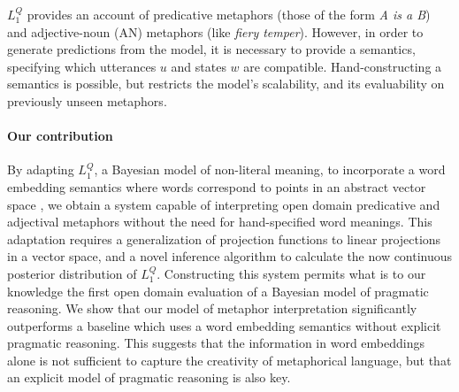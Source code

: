 \documentclass[9pt,twocolumn,twoside,lineno]{pnas-new}
\newcommand{\Listener}{L}
\newcommand{\QLONE}{\Listener_{{1}}^{{Q}}}
\begin{document}
	


	
% 

	$\QLONE$ provides an account of predicative metaphors (those of the form \emph{A is a B}) and adjective-noun (AN) metaphors (like \emph{fiery temper}). However, in order to generate predictions from the model, it is necessary to provide a semantics, specifying which utterances $u$ and states $w$ are compatible. Hand-constructing a semantics is possible, but restricts the model's scalability, and its evaluability on previously unseen metaphors.

	\paragraph{Our contribution} 


	By adapting $\QLONE$, a Bayesian model of non-literal meaning, to incorporate a word embedding semantics where words correspond to points in an abstract vector space \cite{mikolov2013distributed,pennington2014glove}, we obtain a system capable of interpreting open domain predicative and adjectival metaphors without the need for hand-specified word meanings. 
	This adaptation requires a generalization of projection functions to linear projections in a vector space, and a novel inference algorithm to calculate the now continuous posterior distribution of $\QLONE$.
	Constructing this system permits what is to our knowledge the first open domain evaluation of a Bayesian model of pragmatic reasoning.
	We show that our model of metaphor interpretation significantly outperforms a baseline which uses a word embedding semantics without explicit pragmatic reasoning. This suggests that the information in word embeddings alone is not sufficient to capture the creativity of metaphorical language, but that an explicit model of pragmatic reasoning is also key.
\end{document}
